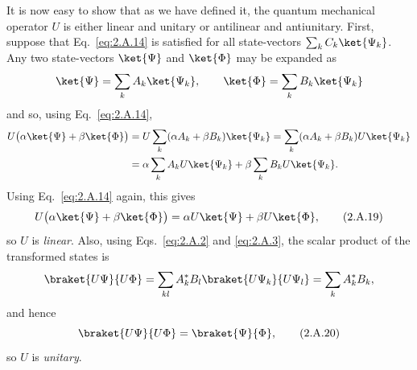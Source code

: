 It is now easy to show that as we have defined it, the quantum mechanical
operator $U$ is either linear and unitary or antilinear and antiunitary.
First, suppose that Eq.~\eqref{eq:2.A.14} is satisfied for all state-vectors
$\sum_k C_k\ket{\Psi_k}$. Any two state-vectors $\ket{\Psi}$ and
$\ket{\Phi}$ may be expanded as
\begin{equation*}
  \ket{\Psi}=\sum_k A_k\ket{\Psi_k},
  \qquad
  \ket{\Phi}=\sum_k B_k\ket{\Psi_k}
\end{equation*}
and so, using Eq.~\eqref{eq:2.A.14},
\begin{align*}
  U\bigl(\alpha\ket{\Psi}+\beta\ket{\Phi}\bigr)
  &=U\sum_k(\alpha A_k+\beta B_k)\ket{\Psi_k}
    =\sum_k(\alpha A_k+\beta B_k)U\ket{\Psi_k}\\
  &=\alpha\sum_k A_k U\ket{\Psi_k}
    +\beta\sum_k B_k U\ket{\Psi_k}.
\end{align*}
Using Eq.~\eqref{eq:2.A.14} again, this gives
\begin{equation}
  U\bigl(\alpha\ket{\Psi}+\beta\ket{\Phi}\bigr)
    =\alpha U\ket{\Psi}+\beta U\ket{\Phi},
  \tag{2.A.19}\label{eq:2.A.19}
\end{equation}
so $U$ is \emph{linear}. Also, using Eqs.~\eqref{eq:2.A.2} and \eqref{eq:2.A.3}, the scalar
product of the transformed states is
\begin{equation*}
  \braket{U\Psi}{U\Phi}
    =\sum_{kl}A_k^*B_l\braket{U\Psi_k}{U\Psi_l}
    =\sum_k A_k^*B_k,
\end{equation*}
and hence
\begin{equation}
  \braket{U\Psi}{U\Phi}=\braket{\Psi}{\Phi},
  \tag{2.A.20}\label{eq:2.A.20}
\end{equation}
so $U$ is \emph{unitary}.

